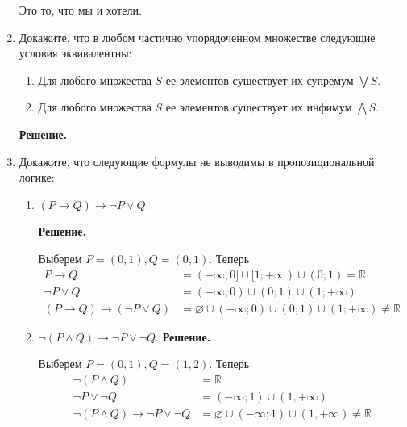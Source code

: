 \begin{enumerate}
    Это то, что мы и хотели.

\item Докажите, что в любом частично упорядоченном множестве следующие условия эквивалентны:
\begin{enumerate}
\item Для любого множества $S$ ее элементов существует их супремум $\bigvee S$.
\item Для любого множества $S$ ее элементов существует их инфимум $\bigwedge S$.
\end{enumerate}

	\textbf{Решение.}
	
	

\item Докажите, что следующие формулы не выводимы в пропозициональной логике:
\begin{enumerate}
\item $(P \to Q) \to \neg P \lor Q$.

	\textbf{Решение.}
	
	Выберем $P = (0, 1), Q = (0, 1)$. Теперь 
	\begin{align*}
		P \to Q &= (-\infty; 0] \cup [1; +\infty) \cup (0; 1) = \mathbb{R} \\
		\neg P \lor Q &= (-\infty; 0) \cup (0; 1) \cup (1; +\infty) \\
		(P \to Q) \to (\neg P \lor Q) &= \varnothing \cup (-\infty; 0) \cup (0; 1) \cup (1; +\infty) \neq 
		\mathbb{R}
	\end{align*}
\item $\neg (P \land Q) \to \neg P \lor \neg Q$.
	\textbf{Решение.}
	
	Выберем $P = (0, 1), Q = (1, 2)$. Теперь
	\begin{align*}
		\neg (P \land Q) &= \mathbb{R} \\
		\neg P \lor \neg Q &= (-\infty; 1) \cup (1, +\infty) \\
		\neg (P \land Q) \to \neg P \lor \neg Q &= \varnothing \cup (-\infty; 1) \cup (1, +\infty) \neq \mathbb{R}
	\end{align*}

\end{enumerate}

\end{enumerate}

